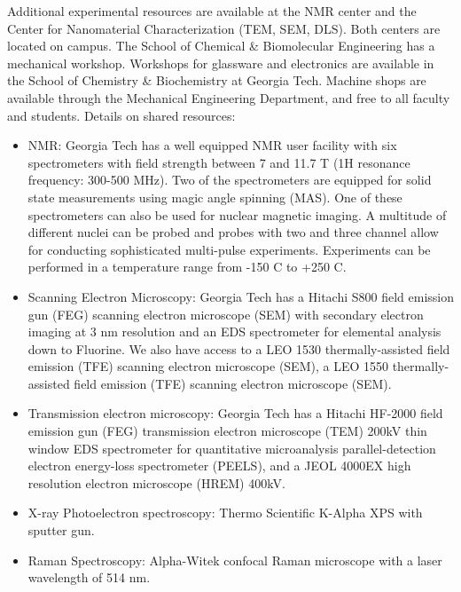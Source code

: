 Additional experimental resources are available at the NMR center and the Center for Nanomaterial Characterization (TEM, SEM, DLS). Both centers are located on campus. The School of Chemical \& Biomolecular Engineering has a mechanical workshop. Workshops for glassware and electronics are available in the School of Chemistry \& Biochemistry at Georgia Tech. Machine shops are available through the Mechanical Engineering Department, and free to all faculty and students. Details on shared resources:
\begin{itemize}
\item NMR: Georgia Tech has a well equipped NMR user facility with six spectrometers with field strength between 7 and 11.7 T (1H resonance frequency: 300-500 MHz). Two of the spectrometers are equipped for solid state measurements using magic angle spinning (MAS). One of these spectrometers can also be used for nuclear magnetic imaging. A multitude of different nuclei can be probed and probes with two and three channel allow for conducting sophisticated multi-pulse experiments. Experiments can be performed in a temperature range from -150 C to +250 C. 

\item Scanning Electron Microscopy: Georgia Tech has a Hitachi S800 field emission gun (FEG) scanning electron microscope (SEM) with secondary electron imaging at 3 nm resolution and an EDS spectrometer for elemental analysis down to Fluorine. We also have access to a LEO 1530 thermally-assisted field emission (TFE) scanning electron microscope (SEM), a LEO 1550 thermally-assisted field emission (TFE) scanning electron microscope (SEM). 

\item Transmission electron microscopy: Georgia Tech has a Hitachi HF-2000 field emission gun (FEG) transmission electron microscope (TEM) 200kV thin window EDS spectrometer for quantitative microanalysis parallel-detection electron energy-loss spectrometer (PEELS), and a JEOL 4000EX high resolution electron microscope (HREM) 400kV.

\item X-ray Photoelectron spectroscopy: Thermo Scientific K-Alpha XPS with sputter gun.

\item Raman Spectroscopy: Alpha-Witek confocal Raman microscope with a laser wavelength of 514 nm.

\end{itemize}

